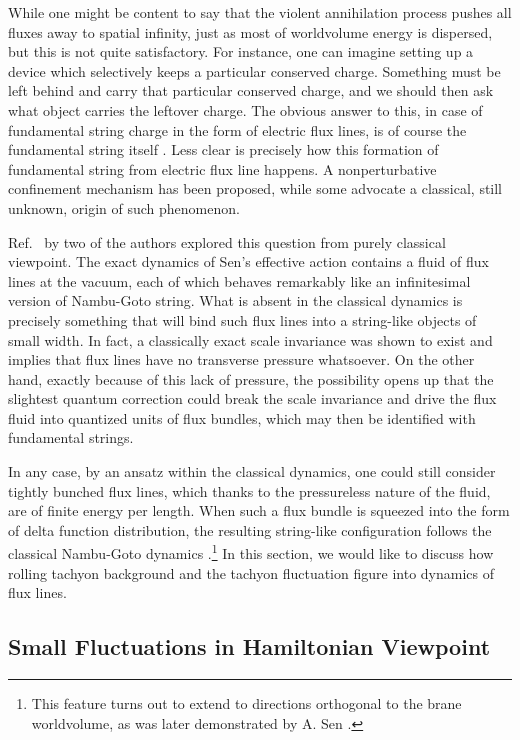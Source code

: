 \documentclass[a4paper,12pt]{article}
\begin{document}
While one might be content to say that the violent annihilation process
pushes all fluxes away to spatial infinity, just as most of worldvolume 
energy is dispersed, but this is not quite satisfactory. For 
instance, one can imagine setting up a device which selectively keeps 
a particular conserved charge. Something must be left behind and
carry that particular conserved charge, and we should then ask 
what object carries the leftover charge. The obvious answer to this,
in case of fundamental string charge  in the form of
electric flux lines, is of course the fundamental string itself
\cite{yi}. Less clear is precisely how this formation of
fundamental string from electric flux line happens. A nonperturbative
confinement mechanism has been proposed, while some advocate a
classical, still unknown, origin of such phenomenon.

Ref.~\cite{fluid} by 
two of the authors explored this question from purely classical
viewpoint. The exact dynamics of Sen's effective action contains a
fluid of flux lines at the vacuum, each of which behaves remarkably like 
an infinitesimal version of Nambu-Goto string.  
What is absent
in the classical dynamics is precisely something that will bind such
flux lines into a string-like objects of small width. In fact, a 
classically exact scale invariance was shown to exist and implies that
flux  
lines  have no transverse pressure whatsoever. On the other hand,
exactly because of this lack of pressure, the  possibility opens up that 
the slightest quantum correction could break the scale invariance and
drive the flux fluid into quantized units of flux bundles, which may 
then be identified with fundamental strings.

In any case, by an ansatz within the classical dynamics, 
one could still consider tightly bunched flux
lines, which thanks to the pressureless nature of the fluid, 
are of finite energy per length. When such a flux bundle is squeezed
into the form of delta function distribution, the resulting string-like
configuration follows the classical Nambu-Goto 
dynamics \cite{fluid,nielsen}.\footnote{This
feature turns out to extend to directions orthogonal to the
brane worldvolume, as was later demonstrated by A. Sen \cite{followup}.}  
In this
section, we would like to discuss how rolling tachyon background and 
the tachyon fluctuation figure into dynamics of flux lines.

\subsection{Small Fluctuations in Hamiltonian Viewpoint}
\end{document}
